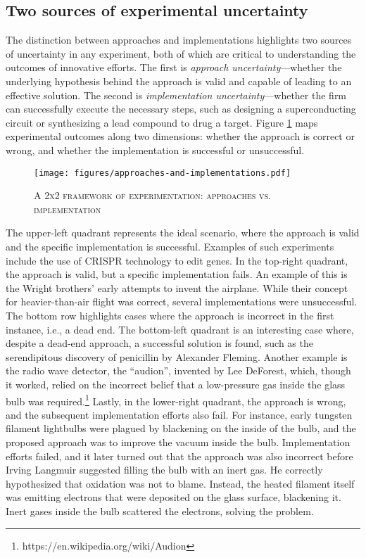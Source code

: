 \subsection{Two sources of experimental uncertainty}

The distinction between approaches and implementations highlights two sources of uncertainty in any experiment, both of which are critical to understanding the outcomes of innovative efforts. The first is \textit{approach uncertainty}---whether the underlying hypothesis behind the approach is valid and capable of leading to an effective solution. The second is \textit{implementation uncertainty}---whether the firm can successfully execute the necessary steps, such as designing a superconducting circuit or synthesizing a lead compound to drug a target. Figure \ref{fig:approaches_and_implementation} maps experimental outcomes along two dimensions: whether the approach is correct or wrong, and whether the implementation is successful or unsuccessful.

\begin{figure}[h]
    \centering
    \caption{\textsc{A 2x2 framework of experimentation: approaches vs. implementation}}
    \texttt{[image: figures/approaches-and-implementations.pdf]}
    \label{fig:approaches_and_implementation}
\end{figure}

\noindent The upper-left quadrant represents the ideal scenario, where the approach is valid and the specific implementation is successful. Examples of such experiments include the use of CRISPR technology to edit genes. In the top-right quadrant, the approach is valid, but a specific implementation fails. An example of this is the Wright brothers' early attempts to invent the airplane. While their concept for heavier-than-air flight was correct, several implementations were unsuccessful. The bottom row highlights cases where the approach is incorrect in the first instance, i.e., a dead end. The bottom-left quadrant is an interesting case where, despite a dead-end approach, a successful solution is found, such as the serendipitous discovery of penicillin by Alexander Fleming. Another example is the radio wave detector, the ``audion'', invented by Lee DeForest, which, though it worked, relied on the incorrect belief that a low-pressure gas inside the glass bulb was required.\footnote{https://en.wikipedia.org/wiki/Audion
} Lastly, in the lower-right quadrant, the approach is wrong, and the subsequent implementation efforts also fail. For instance, early tungsten filament lightbulbs were plagued by blackening on the inside of the bulb, and the proposed approach was to improve the vacuum inside the bulb. Implementation efforts failed, and it later turned out that the approach was also incorrect before Irving Langmuir suggested filling the bulb with an inert gas. He correctly hypothesized that oxidation was not to blame. Instead, the heated filament itself was emitting electrons that were deposited on the glass surface, blackening it. Inert gases inside the bulb scattered the electrons, solving the problem.



